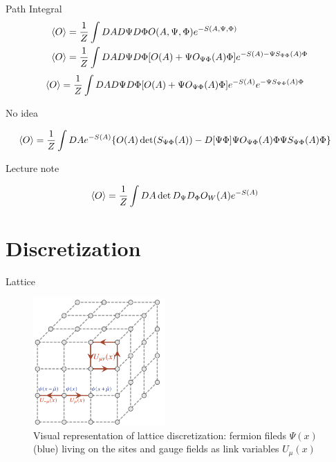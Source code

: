 \documentclass[10pt]{beamer}
\begin{document}
  \begin{frame}{Path Integral}
    \begin{align*}
        \braket{O} &= \frac{1}{Z}\int DA D\Psi D\Phi O(A,\Psi,\Phi)e^{-S(A,\Psi,\Phi)}\\
        \braket{O} &= \frac{1}{Z}\int DA D\Psi D\Phi [O(A) + \Psi O_{\Psi\Phi}(A)\Phi]e^{-S(A) - \Psi S_{\Psi\Phi}(A)\Phi}
    \end{align*}
    \begin{align*}
        \braket{O} &= \frac{1}{Z}\int DA D\Psi D\Phi [O(A) + \Psi O_{\Psi\Phi}(A)\Phi]e^{-S(A)} e^{- \Psi S_{\Psi\Phi}(A)\Phi}
    \end{align*}
     \begin{center} No idea \end{center}\begin{align*}
    \braket{O} &= \frac{1}{Z}\int DA e^{-S(A)}   \{ O(A)\det(S_{\Psi\Phi}(A)) -D[\Psi\Phi] \Psi O_{\Psi\Phi}(A)\Phi\Psi S_{\Psi\Phi}(A)\Phi\}
    \end{align*}
     \begin{center} Lecture note \end{center}\begin{align}\label{eqn:lecturenote}
        \braket{O} &= \frac{1}{Z}\int DA \det D_{\Psi}D_{\Phi} O_W(A)  e^{-S(A)}
    \end{align}
  \end{frame}
 
 \section{Discretization}
 \begin{frame}{Lattice}
    \begin{figure}
    \centering
    \includegraphics[width=0.45\textwidth]{lattice.png}
    \caption{Visual representation of lattice discretization: fermion fileds $\Psi(x)$ (blue) living on the sites and gauge fields as link variables $ U_{\mu}(x)$~\cite{gattringer2009quantum}}
    \end{figure}
 \end{frame}
\end{document}
